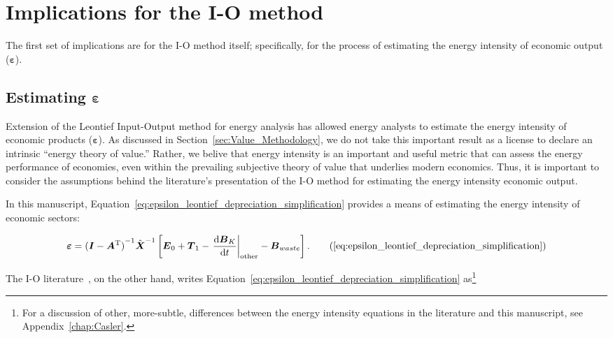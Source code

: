 \section{Implications for the I-O method}
\label{sec:Implications_for_IO}

The first set of implications are for the I-O method itself;
specifically, for the process of estimating
the energy intensity of economic output ($\bm{\varepsilon}$).


\subsection{Estimating $\bm{\varepsilon}$}
\label{sec:estimating_epsilon-implications_chapter}

Extension of the Leontief 
Input-Output method
for energy analysis has allowed energy analysts to estimate 
the energy intensity
of economic products ($\bm{\varepsilon}$). 
As discussed in Section~\ref{sec:Value_Methodology},
we do not take this important result as a license
to declare an intrinsic ``energy theory of value.''
Rather, we belive that energy intensity is an 
important and useful metric that can assess 
the energy performance of economies,
even within the prevailing subjective theory of value
that underlies modern economics. 
Thus, it is important to consider the assumptions behind
the literature's presentation of the I-O method 
for estimating the energy intensity economic output.

In this manuscript, Equation~\ref{eq:epsilon_leontief_depreciation_simplification} 
provides a means of estimating the energy intensity of economic sectors:

\begin{equation}
	\bm{\varepsilon} 
	= {(\vec{I} - \vec{A}^{\mathrm{T}})}^{-1}\hat{\vec{X}}^{-1}
		\left[\vec{E}_{0} 
				+ \vec{T}_{1} 
				- \left. \frac{\mathrm{d}\vec{B}_{K}}{\mathrm{d}t} \right|_{\mathrm{other}}
				- \vec{B}_{waste}
		\right]. \tag{\ref{eq:epsilon_leontief_depreciation_simplification}}
\end{equation}

\noindent{}The I-O literature~\cite{Bullard1975,Casler1984}, 
on the other hand, 
writes Equation~\ref{eq:epsilon_leontief_depreciation_simplification} 
as\footnote{For a discussion of other, more-subtle, differences
between the energy intensity equations in the literature
and this manuscript, see Appendix~\ref{chap:Casler}.}


